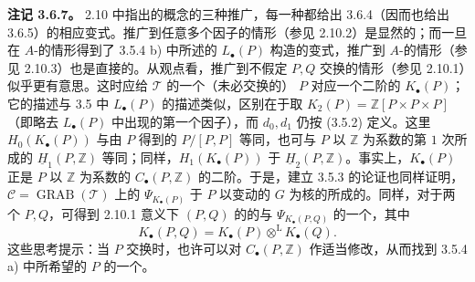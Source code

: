 \textbf{注记 3.6.7。} 2.10 中指出的概念的三种推广，每一种都给出 3.6.4（因而也给出 3.6.5）的相应变式。推广到任意多个因子的情形（参见 2.10.2）是显然的；而一旦在 $A$-的情形得到了 3.5.4 b) 中所述的 $L_\bullet(P)$ 构造的变式，推广到 $A$-的情形（参见 2.10.3）也是直接的。从观点看，推广到不假定 $P,Q$ 交换的情形（参见 2.10.1）似乎更有意思。这时应给 $\mathcal T$ 的一个（未必交换的） $P$ 对应一个二阶的 $K_\bullet(P)$；它的描述与 3.5 中 $L_\bullet(P)$ 的描述类似，区别在于取 $K_2(P)=\mathbb Z[P\times P\times P]$（即略去 $L_\bullet(P)$ 中出现的第一个因子），而 $d_0,d_1$ 仍按 (3.5.2) 定义。这里 $H_0(K_\bullet(P))$ 与由 $P$ 得到的 $P/[P,P]$ 等同，也可与 $P$ 以 $\mathbb Z$ 为系数的第 $1$ 次所成的 $\underline H_1(P,\mathbb Z)$ 等同；同样，$H_1(K_\bullet(P))$ 于 $\underline H_2(P,\mathbb Z)$。事实上，$K_\bullet(P)$ 正是 $P$ 以 $\mathbb Z$ 为系数的 $C_\bullet(P,\mathbb Z)$ 的二阶。于是，建立 3.5.3 的论证也同样证明，$\mathcal C=\operatorname{GRAB}(\mathcal T)$ 上的 $\Psi_{K_\bullet(P)}$
于 $P$ 以变动的 $G$ 为核的所成的。同样，对于两个 $P,Q$，可得到 2.10.1 意义下 $(P,Q)$ 的的与 $\Psi_{K_\bullet(P,Q)}$ 的一个，其中
\[
K_\bullet(P,Q)=K_\bullet(P)\mathbin{\otimes^{\mathrm L}}K_\bullet(Q).
\]
这些思考提示：当 $P$ 交换时，也许可以对 $C_\bullet(P,\mathbb Z)$ 作适当修改，从而找到 3.5.4 a) 中所希望的 $P$ 的一个。


